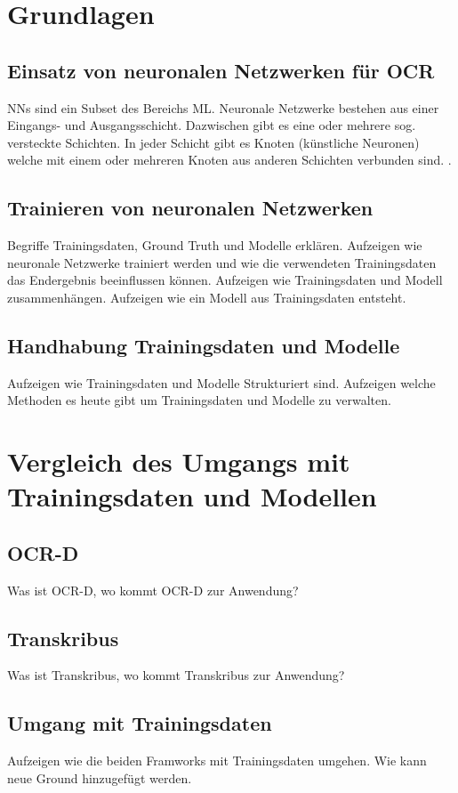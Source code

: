 \documentclass[a4paper,oneside, 12pt]{report}
\begin{document}
\chapter{Grundlagen}\label{sec:grundlagen}
\section{Einsatz von neuronalen Netzwerken für OCR}
\acp{NN} sind ein Subset des Bereichs \ac{ML}. Neuronale Netzwerke bestehen aus einer Eingangs- und Ausgangsschicht. Dazwischen gibt es eine oder mehrere sog. versteckte Schichten. In jeder Schicht gibt es Knoten (künstliche Neuronen) welche mit einem oder mehreren Knoten aus anderen Schichten verbunden sind. \cite{ibmnn}. 


\section{Trainieren von neuronalen Netzwerken}
Begriffe Trainingsdaten, Ground Truth und Modelle erklären. Aufzeigen wie neuronale Netzwerke trainiert werden und wie die verwendeten Trainingsdaten das Endergebnis beeinflussen können. Aufzeigen wie Trainingsdaten und Modell zusammenhängen. Aufzeigen wie ein Modell aus Trainingsdaten entsteht. 
\section{Handhabung Trainingsdaten und Modelle}
Aufzeigen wie Trainingsdaten und Modelle Strukturiert sind.  Aufzeigen welche Methoden es heute gibt um Trainingsdaten und Modelle zu verwalten.
\chapter{Vergleich des Umgangs mit Trainingsdaten und Modellen}\label{sec:vergleich}

\section{OCR-D}
Was ist OCR-D, wo kommt OCR-D zur Anwendung?
\section{Transkribus}
Was ist Transkribus, wo kommt Transkribus zur Anwendung?

\section{Umgang mit Trainingsdaten}
Aufzeigen wie die beiden Framworks mit Trainingsdaten umgehen. Wie kann neue Ground hinzugefügt werden.
\end{document}
